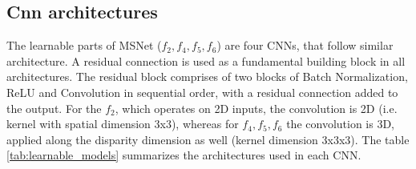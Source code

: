 \documentclass[runningheads]{llncs}
\begin{document}


\subsection*{Cnn architectures}

The learnable parts of MSNet ($f_2, f_4, f_5, f_6$) are four CNNs, that follow similar architecture. A residual connection is used as a fundamental building block in all architectures. The residual block comprises of two blocks of Batch Normalization, ReLU and Convolution in sequential order, with a residual connection added to the output. For the $f_2$, which operates on 2D inputs, the convolution is 2D (i.e. kernel with spatial dimension 3x3), whereas for $f_4, f_5, f_6$ the convolution is 3D, applied along the disparity dimension as well (kernel dimension 3x3x3). The table \ref{tab:learnable_models} summarizes the architectures used in each CNN.
\end{document}
